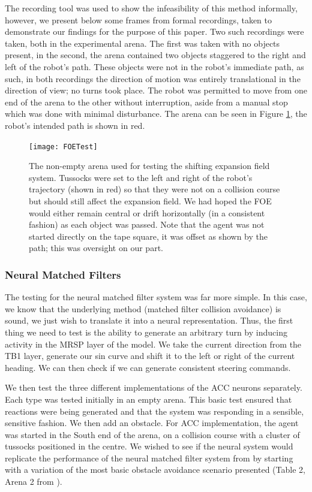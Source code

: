 \documentclass[a4paper,11pt,twoside,openright]{article}
\begin{document}
The recording tool was used to show the infeasibility of this method
informally, however, we present below some frames from formal
recordings, taken to demonstrate our findings for the purpose of this
paper. Two such recordings were taken, both in the experimental
arena. The first was taken with no objects present, in the second, the
arena contained two objects staggered to the right and left of the
robot's path. These objects were not in the robot's immediate path, as
such, in both recordings the direction of motion was entirely
translational in the direction of view; no turns took place. The robot
was permitted to move from one end of the arena to the other without
interruption, aside from a manual stop which was done with minimal
disturbance. The arena can be seen in Figure \ref{fig:foetest}, the
robot's intended path is shown in red.

\begin{figure}[h!]
  \centering
  \texttt{[image: FOETest]}
  \caption{\label{fig:foetest} The non-empty arena used for testing
    the shifting expansion field system. Tussocks were set to the left
    and right of the robot's trajectory (shown in red) so that they
    were not on a collision course but should still affect the
    expansion field. We had hoped the FOE would either remain central
    or drift horizontally (in a consistent fashion) as each object was
    passed. Note that the agent was not started directly on the tape
    square, it was offset as shown by the path; this was oversight on
    our part.  }
\end{figure}

\subsubsection{Neural Matched Filters}
The testing for the neural matched filter system was far more
simple. In this case, we know that the underlying method (matched
filter collision avoidance) is sound, we just wish to translate it
into a neural representation. Thus, the first thing we need to test is
the ability to generate an arbitrary turn by inducing activity in the
MRSP layer of the model. We take the current direction from the TB1
layer, generate our sin curve and shift it to the left or right of the
current heading. We can then check if we can generate consistent
steering commands.
\newline
\par

We then test the three different implementations of the ACC neurons
separately. Each type was tested initially in an empty arena. This
basic test ensured that reactions were being generated and that the
system was responding in a sensible, sensitive fashion. We then add an
obstacle.  For ACC implementation, the agent was started in the South
end of the arena, on a collision course with a cluster of tussocks
positioned in the centre. We wished to see if the neural system would
replicate the performance of the neural matched filter system from
\cite{Mitchell2018} by starting with a variation of the most basic
obstacle avoidance scenario presented (Table 2, Arena 2 from
\cite{Mitchell2018}).
\newline\par
\end{document}
